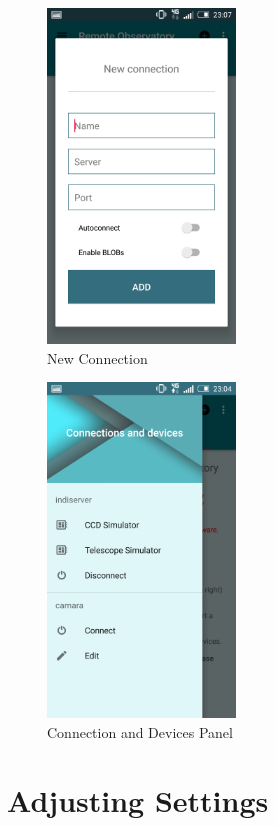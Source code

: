 \begin{figure}
 \centering
 \includegraphics[width=5cm]{../images/newConnection2.png}
 \caption{New Connection}
 \label{fig:newConnection}
\end{figure}


\begin{figure}
 \centering
 \includegraphics[width=5cm]{../images/connectionAndDevicesPanel2.png}
 \caption{Connection and Devices Panel}
 \label{fig:connectionAndDevicesPanel}
\end{figure}


            

                
\label{settings}
\section{Adjusting Settings}

